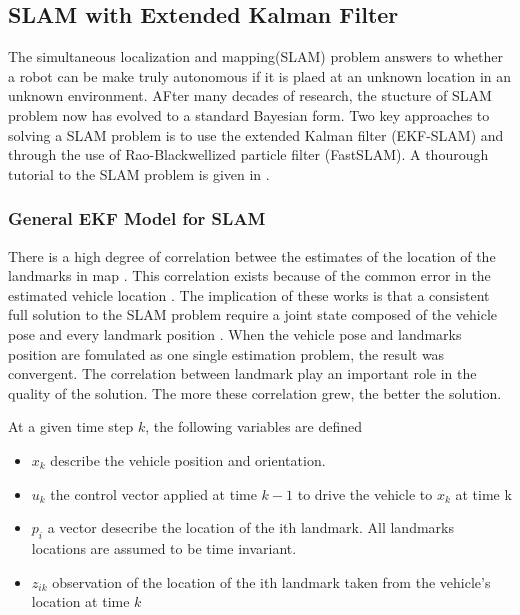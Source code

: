 \subsection{SLAM with Extended Kalman Filter}

The simultaneous localization and mapping(SLAM) problem answers to
whether a robot can be make truly autonomous if it is plaed at an
unknown location in an unknown environment. AFter many decades of
research, the stucture of SLAM problem now has evolved to a standard
Bayesian form. Two key approaches to solving a SLAM problem is to use
the extended Kalman filter (EKF-SLAM) and through the use of
Rao-Blackwellized particle filter (FastSLAM). A thourough tutorial to
the SLAM problem is given in \cite{durrant-whyte_simultaneous_2006}
\cite{bailey_simultaneous_2006}.

\subsubsection{General EKF Model for SLAM}
There is a high degree of correlation betwee the estimates of the
location of the landmarks in map \cite{smith_representation_1986}
\cite{durrant-whyte_uncertain_1988}. This correlation exists because
of the common error in the estimated vehicle location
\cite{leonard_simultaneous_1991}. The implication of these works is
that a consistent full solution to the SLAM problem require a joint
state composed of the vehicle pose and every landmark position
\cite{durrant-whyte_simultaneous_2006}. When the vehicle pose and
landmarks position are fomulated as one single estimation problem, the
result was convergent. The correlation between landmark play an
important role in the quality of the solution. The more these
correlation grew, the better the solution.
\cite{durrant-whyte_localization_1996} \cite{csorba_new_1996}
\cite{csorba_simultaneous_1997} \cite{dissanayake_solution_2001}

At a given time step $k$, the following variables are defined
\begin{itemize}
  \item $x_k$ describe the vehicle position and orientation.
  \item $u_k$ the control vector applied at time $k-1$ to drive the
  vehicle to $x_k$ at time k
  \item $p_i$ a vector desecribe the location of the ith landmark. All
  landmarks locations are assumed to be time invariant.  
  \item $z_{ik}$ observation of the location of the ith landmark taken
  from the vehicle's location at time $k$
\end{itemize}

